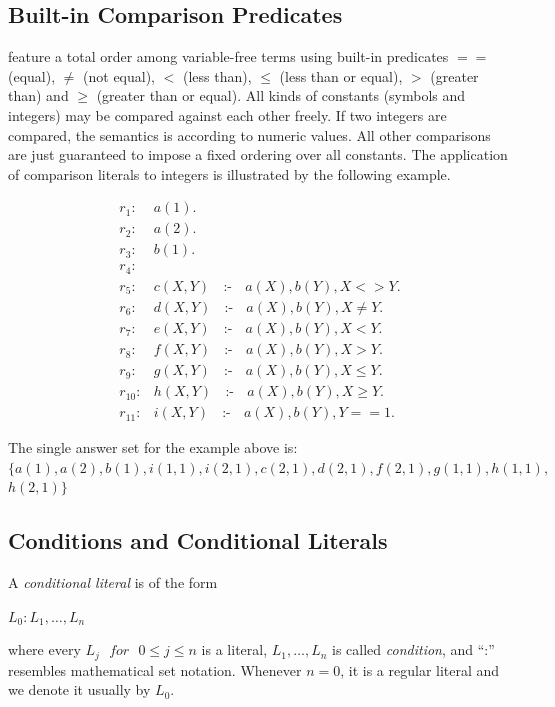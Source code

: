 \documentclass[14pt,a4paper, titlepage]{article}
\DeclareMathOperator{\leftimpl}{:-}
\begin{document}
\subsection{Built-in Comparison Predicates}
\dlvhex{} feature a total order among variable-free terms using built-in predicates $==$ (equal), $\neq$ (not equal), $<$ (less than), $\leq$ (less than or equal), $>$ (greater than) and $\geq$ (greater than or equal). All kinds of constants (symbols and integers) may be compared against each other freely. If two integers are compared, the semantics is according to numeric values. All other comparisons are just guaranteed to impose a fixed ordering over all constants. The application of comparison literals to integers is illustrated by the following example.
\begin{exmp}
\begin{align*}
r_1\colon& a(1). \\
r_2\colon& a(2). \\
r_3\colon& b(1). \\
r_4\colon& \\
r_5\colon& c(X,Y) \text{ } \leftimpl \text{ } a(X), b(Y), X <> Y. \\
r_6\colon& d(X,Y) \text{ } \leftimpl \text{ } a(X), b(Y), X \neq Y. \\
r_7\colon& e(X,Y) \text{ } \leftimpl \text{ } a(X), b(Y), X < Y. \\
r_8\colon& f(X,Y) \text{ } \leftimpl \text{ } a(X), b(Y), X > Y. \\
r_9\colon& g(X,Y) \text{ } \leftimpl \text{ } a(X), b(Y), X \leq Y. \\
r_{10}\colon& h(X,Y) \text{ } \leftimpl \text{ } a(X), b(Y), X \geq Y. \\
r_{11}\colon& i(X,Y) \text{ } \leftimpl \text{ } a(X), b(Y), Y == 1. 
\end{align*}
\end{exmp}
The single answer set for the example above is:\\ $\mathit{\{a(1),a(2),b(1),i(1,1),i(2,1),c(2,1),d(2,1),f(2,1),g(1,1),h(1,1)},$\\
$\mathit{h(2,1)}\}$

\subsection{Conditions and Conditional Literals}
A \emph{conditional literal} is of the form \\ \centerline{$L_0:L_1,\dots,L_n$} where every $\mathit{L_j \text{ } for \text{ } 0 \leq j \leq n}$ is a literal, $L_1,\dots,L_n$ is called \emph{condition}, and \enquote{:} resembles mathematical set notation. Whenever $\mathit{n = 0}$, it is a regular literal and we denote it usually by $L_0$.
\end{document}
